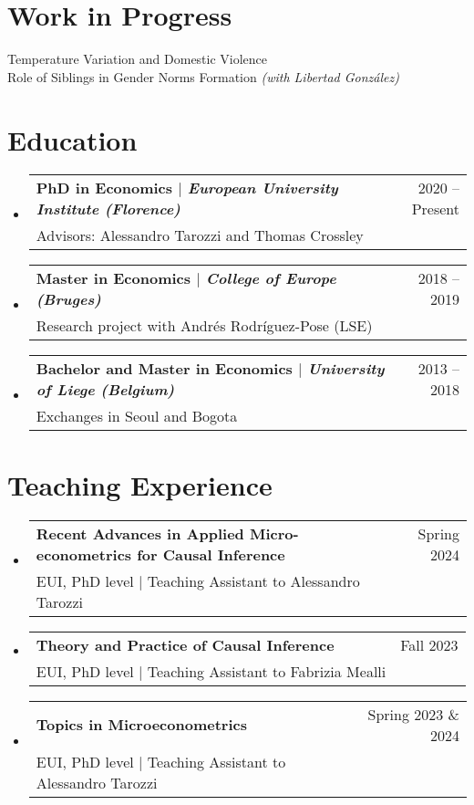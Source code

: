 \documentclass[11pt]{article}
\makeatletter
\newcommand{\CVSubheading}[4]{
  \vspace{-2pt}\item
    \begin{tabular*}{0.97\textwidth}[t]{l@{\extracolsep{\fill}}r}
      \textbf{#1} & #2 \\
      \small#3 & \small #4 \\
    \end{tabular*}\vspace{-7pt}
}
\newcommand{\CVSubHeadingListStart}{\begin{itemize}[leftmargin=0.5cm, label={}]}
\newcommand{\CVSubHeadingListEnd}{\end{itemize}}
\makeatother
\begin{document}

\section{Work in Progress}
 \begin{itemize}[leftmargin=0.5cm, label={}]
    \small{\item{
	Temperature Variation and Domestic Violence\\
	\vspace{.2cm}
	Role of Siblings in Gender Norms Formation \textit{(with Libertad González)}
    }}
 \end{itemize}
 


\section{Education}
  \CVSubHeadingListStart
    \CVSubheading
      {{PhD in Economics $|$ \emph{\small{European University Institute (Florence)}}}}{2020 -- Present}
      {Advisors: Alessandro Tarozzi and Thomas Crossley}{}
    \CVSubheading
      {{Master in Economics $|$ \emph{\small{College of Europe (Bruges)}}}}{2018 -- 2019}
      {Research project with Andrés Rodríguez-Pose (LSE)}{}
    \CVSubheading
      {{Bachelor and Master in Economics $|$ \emph{\small{University of Liege (Belgium)}}}}{2013 -- 2018}
      {Exchanges in Seoul and Bogota}{}
  \CVSubHeadingListEnd
  

 

\section{Teaching Experience}
  \CVSubHeadingListStart
    \CVSubheading
      {{Recent Advances in Applied Micro-econometrics for Causal Inference}}{Spring 2024}
      {EUI, PhD level $|$ Teaching Assistant to Alessandro Tarozzi} {}
     \CVSubheading
      {{Theory and Practice of Causal Inference}}{Fall 2023}
      {EUI, PhD level $|$ Teaching Assistant to Fabrizia Mealli} {}
    \CVSubheading
      {{Topics in Microeconometrics}}{Spring 2023 \& 2024}
      {EUI, PhD level $|$ Teaching Assistant to Alessandro Tarozzi} {}
  \CVSubHeadingListEnd
\end{document}
